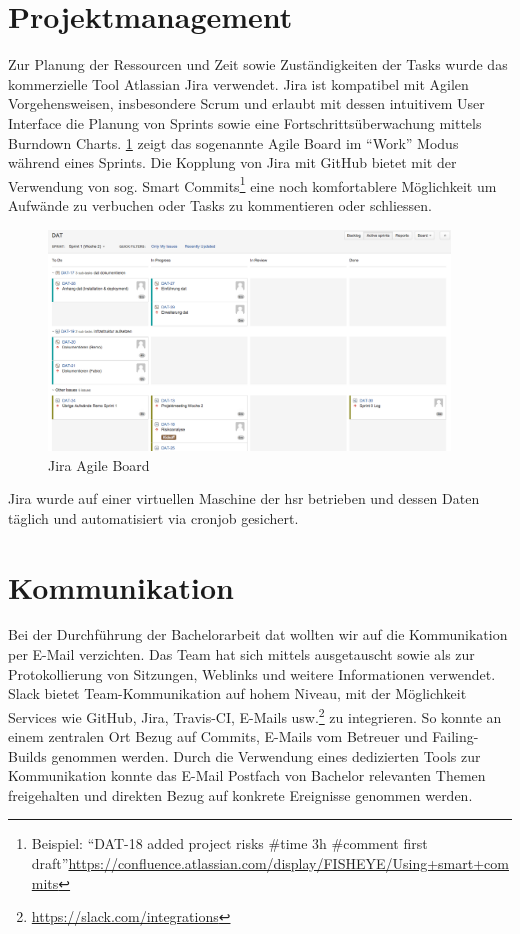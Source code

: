 \section{Projektmanagement}

Zur Planung der Ressourcen und Zeit sowie Zuständigkeiten der Tasks wurde das kommerzielle Tool Atlassian Jira verwendet. Jira ist kompatibel mit Agilen Vorgehensweisen, insbesondere Scrum und erlaubt mit dessen intuitivem User Interface die Planung von Sprints sowie eine Fortschrittsüberwachung mittels Burndown Charts. \cref{fig:pm:jira-agile} zeigt das sogenannte Agile Board im ``Work'' Modus während eines Sprints. Die Kopplung von Jira mit GitHub bietet mit der Verwendung von sog. Smart Commits\footnote{Beispiel: ``DAT-18 added project risks \#time 3h \#comment first draft''\newline\url{https://confluence.atlassian.com/display/FISHEYE/Using+smart+commits}} eine noch komfortablere Möglichkeit um Aufwände zu verbuchen oder Tasks zu kommentieren oder schliessen.

\begin{figure}[H]
	\centering
	\includegraphics[width=0.95\textwidth]{fig/jira-agile}
	\caption{Jira Agile Board}
	\label{fig:pm:jira-agile}
\end{figure}

Jira wurde auf einer virtuellen Maschine der \acs{hsr} betrieben und dessen Daten täglich und automatisiert via cronjob gesichert.


\section{Kommunikation}
Bei der Durchführung der Bachelorarbeit \gls{dat} wollten wir auf die Kommunikation per E-Mail verzichten. Das Team hat sich mittels  ausgetauscht sowie als zur Protokollierung von Sitzungen, Weblinks und weitere Informationen verwendet. Slack bietet Team-Kommunikation auf hohem Niveau, mit der Möglichkeit Services wie GitHub, Jira, Travis-CI, E-Mails usw.\footnote{\url{https://slack.com/integrations}} zu integrieren. So konnte an einem zentralen Ort Bezug auf Commits, E-Mails vom Betreuer und Failing-Builds genommen werden. Durch die Verwendung eines dedizierten Tools zur Kommunikation konnte das E-Mail Postfach von Bachelor relevanten Themen freigehalten und direkten Bezug auf konkrete Ereignisse genommen werden.

